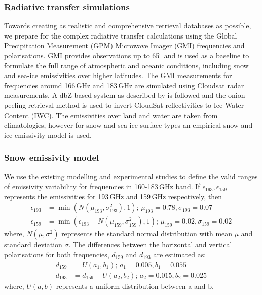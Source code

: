 \documentclass[12pt,oneside,a4paper]{article}
\begin{document}
\subsubsection{Radiative transfer simulations}
%
\label{sec:radiative_transfer}
Towards creating as realistic and comprehensive retrieval databases as possible, we prepare for the complex radiative transfer calculations using the Global Precipitation Measurement (GPM) Microwave Imager (GMI) frequencies and polarisations. GMI provides observations up to 65$^{\circ}$ and is used as a baseline to formulate the full range of atmospheric and oceanic conditions, including snow and sea-ice emissivities over higher latitudes. The GMI measurements for frequencies around 166\,GHz and 183\,GHz are simulated using Cloudsat radar measurements. A dbZ based system as described by \citet{ekelund:using:20} is followed and the onion peeling retrieval method is used to invert CloudSat reflectivities to Ice Water Content (IWC). The emissivities over land and water are taken from climatologies, however for snow and sea-ice surface types an empirical snow and ice emissivity model is used.

\subsubsection*{Snow emissivity model}
%
We use the existing modelling and experimental studies\citep{harlow:2009:milli, harlow:2012:tundr,hewison:2002:airbo} to define the valid ranges of emissivity variability for frequencies in 160-183\,GHz band. If $\epsilon_{193}, \epsilon_{159}$ represents the emissivities for 193\,GHz and 159\,GHz respectively, then
\begin{align}
\epsilon_{193}& = \min({N(\mu_{193}, \sigma_{193}^{2}), 1});\, \mu_{193} = 0.78, \sigma_{193} = 0.07 \\
\epsilon_{159}& = \min(\epsilon_{193} - N(\mu_{159}, \sigma_{159}^{2}), 1) ;\,  \mu_{159} = 0.02, \sigma_{159} = 0.02\,
\end{align}
where, $N(\mu, \sigma^{2})$ represents the standard normal distribution with mean $\mu$ and standard deviation $\sigma$. The differences between the horizontal and vertical polarisations for both frequencies, $d_{159}$ and $d_{193}$ are estimated as:
\begin{align}
d_{159}& = U(a_1, b_1) ;\, a_1 = 0.005, b_1 = 0.055\\
d_{193}& = d_{159} - U(a_2, b_2) ;\, a_2 = 0.015, b_2 = 0.025 \,
\end{align}
where, $U(a, b)$ represents a uniform distribution between a and b. 
\end{document}
